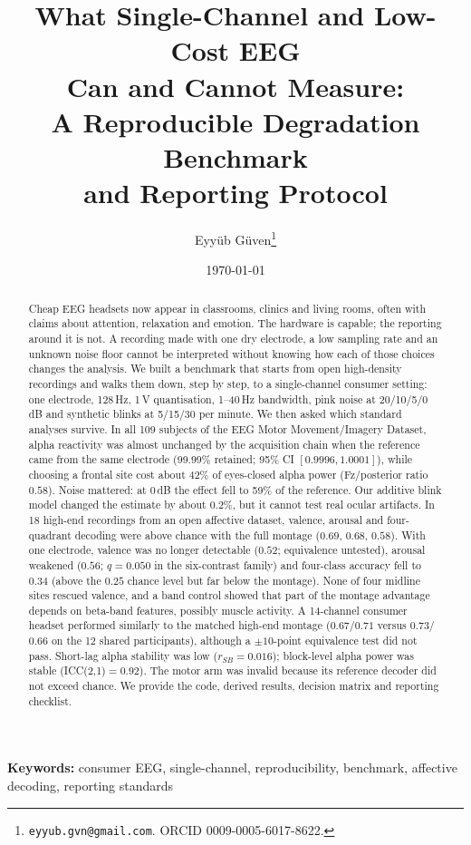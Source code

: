 \documentclass[11pt,a4paper]{article}
\title{What Single-Channel and Low-Cost EEG\\
Can and Cannot Measure:\\[2pt]
A Reproducible Degradation Benchmark\\
and Reporting Protocol}
\author{Eyy\"ub G\"uven\thanks{\texttt{eyyub.gvn@gmail.com}. ORCID 0009-0005-6017-8622.}}
\date{\today}
\newif\iftwocolabstract
\begin{document}
\maketitle

\iftwocolabstract\begin{multicols}{2}\fi
\begin{abstract}
\noindent
Cheap EEG headsets now appear in classrooms, clinics and living rooms, often with claims
about attention, relaxation and emotion. The hardware is capable; the reporting around
it is not. A recording made with one dry electrode, a low sampling rate and an unknown
noise floor cannot be interpreted without knowing how each of those choices changes the
analysis. We built a benchmark that starts from open high-density recordings and walks
them down, step by step, to a single-channel consumer setting: one electrode, 128\,Hz,
1\,\textmu V quantisation, 1--40\,Hz bandwidth, pink noise at 20/10/5/0\,dB and
synthetic blinks at 5/15/30 per minute. We then asked which standard analyses survive.
In all 109 subjects of the EEG Motor Movement/Imagery Dataset, alpha reactivity was
almost unchanged by the acquisition chain when the reference came from the same
electrode (99.99\% retained; 95\% CI $[0.9996, 1.0001]$), while choosing a frontal site
cost about 42\% of eyes-closed alpha power (Fz/posterior ratio $0.58$). Noise mattered:
at 0\,dB the effect fell to 59\% of the reference. Our additive blink model changed the
estimate by about 0.2\%, but it cannot test real ocular artifacts. In 18 high-end
recordings from an open affective dataset, valence, arousal and four-quadrant decoding
were above chance with the full montage ($0.69$, $0.68$, $0.58$). With one electrode,
valence was no longer detectable ($0.52$; equivalence untested), arousal weakened
($0.56$; $q=0.050$ in the six-contrast family) and four-class accuracy fell to $0.34$
(above the $0.25$ chance level but far below the montage). None of four midline sites
rescued valence, and a band control showed that part of the montage advantage depends
on beta-band features, possibly muscle activity. A 14-channel consumer headset
performed similarly to the matched high-end montage ($0.67$/$0.71$ versus $0.73$/$0.66$
on the 12 shared participants), although a $\pm10$-point equivalence test did not pass.
Short-lag alpha stability was low ($r_{SB}=0.016$); block-level alpha power was stable
(ICC(2,1)$=0.92$). The motor arm was invalid because its reference decoder did not
exceed chance. We provide the code, derived results, decision matrix and reporting
checklist.
\end{abstract}

\noindent\textbf{Keywords:} consumer EEG, single-channel, reproducibility, benchmark,
affective decoding, reporting standards
\iftwocolabstract\end{multicols}\fi
\clearpage
\end{document}
